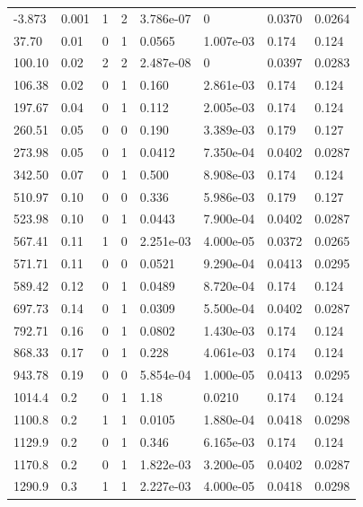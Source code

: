 \documentclass[preview]{standalone}
\begin{document}
{{\begin{tabular}{L{1.2cm}C{1.2cm} C{0.3cm}C{0.5cm} C{1.4cm}C{1.4cm} C{1.4cm}C{1.4cm}}
  -3.873  &  0.001  & 1     &  2 &  3.786e-07  & 0  & 0.0370 &  0.0264   \\ 
  37.70  &  0.01  & 0     &  1 &  0.0565  & 1.007e-03  & 0.174 &  0.124   \\ 
  100.10  &  0.02  & 2     &  2 &  2.487e-08  & 0  & 0.0397 &  0.0283   \\ 
  106.38  &  0.02  & 0     &  1 &  0.160  & 2.861e-03  & 0.174 &  0.124   \\ 
  197.67  &  0.04  & 0     &  1 &  0.112  & 2.005e-03  & 0.174 &  0.124   \\ 
  260.51  &  0.05  & 0     &  0 &  0.190  & 3.389e-03  & 0.179 &  0.127   \\ 
  273.98  &  0.05  & 0     &  1 &  0.0412  & 7.350e-04  & 0.0402 &  0.0287   \\ 
  342.50  &  0.07  & 0     &  1 &  0.500  & 8.908e-03  & 0.174 &  0.124   \\ 
  510.97  &  0.10  & 0     &  0 &  0.336  & 5.986e-03  & 0.179 &  0.127   \\ 
  523.98  &  0.10  & 0     &  1 &  0.0443  & 7.900e-04  & 0.0402 &  0.0287   \\ 
  567.41  &  0.11  & 1     &  0 &  2.251e-03  & 4.000e-05  & 0.0372 &  0.0265   \\ 
  571.71  &  0.11  & 0     &  0 &  0.0521  & 9.290e-04  & 0.0413 &  0.0295   \\ 
  589.42  &  0.12  & 0     &  1 &  0.0489  & 8.720e-04  & 0.174 &  0.124   \\ 
  697.73  &  0.14  & 0     &  1 &  0.0309  & 5.500e-04  & 0.0402 &  0.0287   \\ 
  792.71  &  0.16  & 0     &  1 &  0.0802  & 1.430e-03  & 0.174 &  0.124   \\ 
  868.33  &  0.17  & 0     &  1 &  0.228  & 4.061e-03  & 0.174 &  0.124   \\ 
  943.78  &  0.19  & 0     &  0 &  5.854e-04  & 1.000e-05  & 0.0413 &  0.0295   \\ 
  1014.4  &   0.2  & 0     &  1 &  1.18  & 0.0210  & 0.174 &  0.124   \\ 
  1100.8  &   0.2  & 1     &  1 &  0.0105  & 1.880e-04  & 0.0418 &  0.0298   \\ 
  1129.9  &   0.2  & 0     &  1 &  0.346  & 6.165e-03  & 0.174 &  0.124   \\ 
  1170.8  &   0.2  & 0     &  1 &  1.822e-03  & 3.200e-05  & 0.0402 &  0.0287   \\ 
  1290.9  &   0.3  & 1     &  1 &  2.227e-03  & 4.000e-05  & 0.0418 &  0.0298   \\ 

\end{tabular}}}
\end{document}
